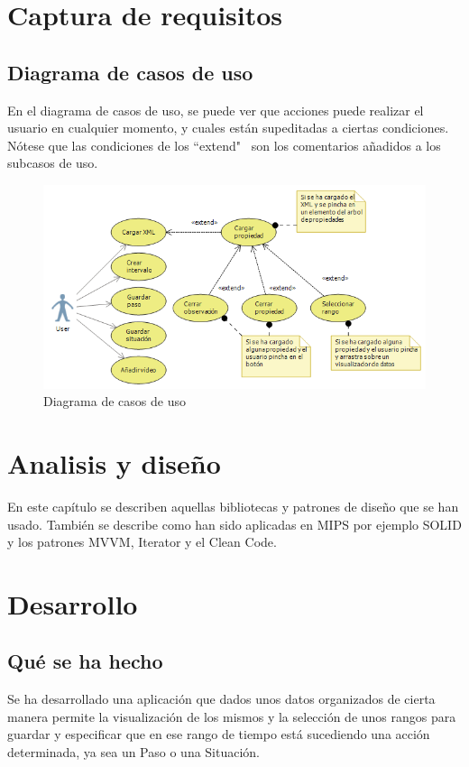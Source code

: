 \documentclass[12pt, a4paper]{report}
\begin{document}
\chapter{Captura de requisitos}
\section{Diagrama de casos de uso}
En el diagrama de casos de uso, se puede ver que acciones puede realizar el 
usuario en cualquier momento, y cuales
est\'an supeditadas a ciertas condiciones. N\'otese que las condiciones de los 
``extend" \ son los comentarios a\~nadidos
a los subcasos de uso.

\begin{figure}[h]
\centering
\includegraphics[width=1.0\linewidth]{../Figures/useCaseDiagram.png}
\caption[Diagrama de casos de uso]{Diagrama de casos de uso}
\label{fig:useCaseDiagram}
\end{figure}

\chapter{Analisis y dise\~no}
En este cap\'itulo se describen aquellas bibliotecas y patrones de dise\~no que 
se han usado. Tambi\'en se describe como han sido aplicadas en MIPS por ejemplo 
SOLID y los patrones MVVM, Iterator y el Clean Code.

\chapter{Desarrollo}
\section{Qu\'e se ha hecho}
Se ha desarrollado una aplicaci\'{o}n que dados unos datos organizados de 
cierta manera permite la visualizaci\'{o}n de los mismos y la selecci\'{o}n de 
unos rangos para guardar y especificar que en ese rango de tiempo est\'{a} 
sucediendo una acci\'{o}n determinada, ya sea un Paso o una Situaci\'on.
\end{document}
